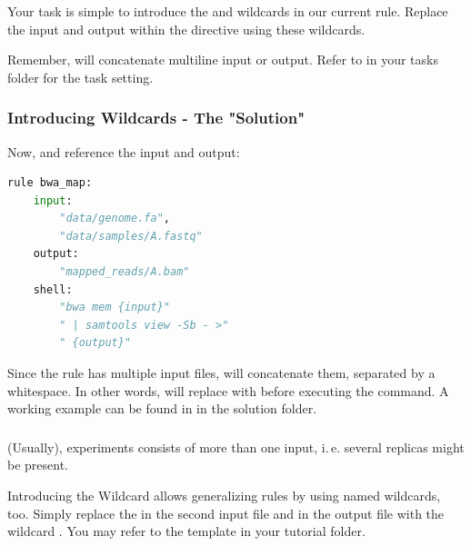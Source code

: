 \begin{frame}[fragile]
	\frametitle{}
	\begin{task}
	   Your task is simple to introduce the  and   wildcards in our current  rule. Replace the input and output within the  directive using these wildcards.
	\end{task}
    \begin{hint}
       Remember, \Snakemake{} will concatenate multiline input or output. Refer to   in your tasks folder for the task setting.
    \end{hint}
\end{frame}

\begin{frame}[fragile]
  \frametitle{Introducing Wildcards - The "Solution"}
  Now,  and  reference the input and output:
  \begin{lstlisting}[language=Python,style=Python]
rule bwa_map:
    input:
        "data/genome.fa",
        "data/samples/A.fastq"
    output:
        "mapped_reads/A.bam"
    shell:
        "bwa mem {input}"
        " | samtools view -Sb - >"
        " {output}"
    \end{lstlisting}
    Since the rule has multiple input files, \Snakemake{} will concatenate them, separated by a whitespace. In other words, \Snakemake{} will replace  with  before executing the command.\newline
    A working example can be found in  in the solution folder.
\end{frame}

\begin{frame}[fragile]
  \frametitle{}
  (Usually), experiments consists of more than one input, i.\,e. several replicas might be present.\newline
  \begin{task}{Introducing the  Wildcard}
    \Snakemake{} allows generalizing rules by using named wildcards, too. Simply replace the  in the second input file and in the output file with the wildcard .\newline
    You may refer to the  template in your tutorial folder.
  \end{task}
\end{frame}

